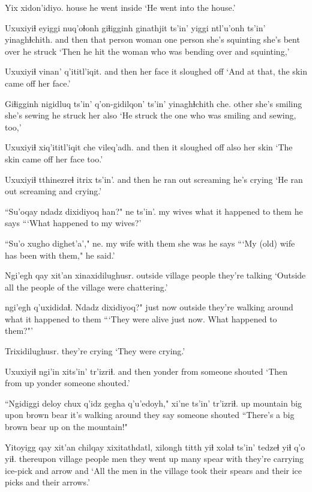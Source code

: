 \documentclass[12pt]{article}
\begin{document}
\gll Yix xidon'idiyo.
house {he went inside}
\glt `He went into the house.'
\glend 

\gll Uxuxiyiɬ eyiggi nuq'oɬonh giɬigginh ginathjit ts'in' {yiggi ntl'u'onh} ts'in' yinaghɬchith.
{and then}  {that person}  woman  {one person} {she's squinting} {} {she's bent over} {}  {he struck}
\glt `Then he hit the woman who was bending over and squinting,'
\glend 

\gll Uxuxiyiɬ vinan' q'ititl'iqit.
{and then}  {her face} {it sloughed off}
\glt `And at that, the skin came off her face.'
\glend 

\gll Giɬigginh nigidluq ts'in' q'on-gidilqon' ts'in' yinaghɬchith che.
other {she's smiling} {} {she's sewing} {} {he struck her} also
\glt `He struck the one who was smiling and sewing, too,'
\glend 

\gll Uxuxiyiɬ xiq'ititl'iqit che vileq'adh.
{and then}  {it sloughed off} also {her skin}
\glt `The skin came off her face too.'
\glend 

\gll Uxuxiyiɬ tthinezreɬ  itrix ts'in'.
{and then}  {he ran out screaming} {he's crying} {}
\glt `He ran out screaming and crying.'
\glend 

\gll ``Su'oqay ndadz dixidiyoq han?"  ne ts'in'.
{my wives} what  {it happened to them} {} {he says} {}
\glt ```What happened to my wives?'
\glend 

\gll ``Su'o  xugho dighet'a'," ne.
{my wife} {with them} {she was} {he says}
\glt ```My (old) wife has been with them," he said.'
\glend 

\gll Ngi'egh qay xit'an xinaxidilughusr.
outside  village people {they're talking}
\glt `Outside all the people of the village were chattering.'
\glend 

 ngi'egh q'uxididaɬ.  Ndadz dixidiyoq?"
{just now} outside {they're walking around} what  {it happened to them}
\glt ```They were alive just now. What happened to them?"'
\glend 

\gll Trixidilughusr.
{{they're crying}}
\glt `They were crying.'
\glend 

\gll Uxuxiyiɬ ngi'in xits'in' tr'izriɬ.
{and then}  yonder from  {someone shouted}
\glt `Then from up yonder someone shouted.'
\glend 

\gll ``Ngidiggi deloy  chux q'idz gegha  q'u'edoyh," xi'ne ts'in'  tr'izriɬ.
up  mountain big upon {brown bear} {it's walking around}  {they say} {}  {someone shouted}
\glt  ``There's a big brown bear up on the mountain!"
\glend 

\gll Yitoyigg qay xit'an chilqay xixitathdatl, xilongh titth yiɬ xolaɬ ts'in' tedzeɬ yiɬ q'o yiɬ.
thereupon village people  men  {they went up} many  spear with {they're carrying} {} ice-pick and arrow and
\glt `All the men in the village took their spears and their ice picks and their arrows.'
\glend 
\end{document}
